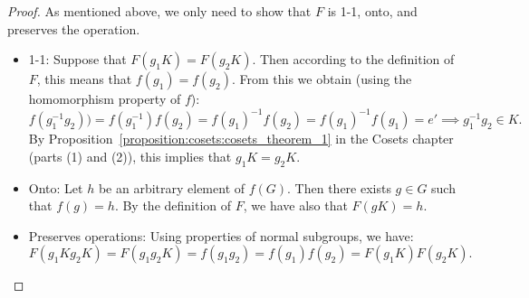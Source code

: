 \begin{proof}
As mentioned above, we only need to show that $F$ is 1-1, onto, and preserves the operation.
\begin{itemize}
\item
1-1: Suppose that $F(g_1K) = F(g_2K)$.  Then according to the definition of $F$, this means that
$f(g_1) = f(g_2)$. From this we obtain (using the homomorphism property of $f$):
\[ f(g_1^{-1}g_2)) = f(g_1^{-1})f(g_2) =  f(g_1)^{-1}f(g_2) = f(g_1)^{-1}f(g_1) = e'  \implies g_1^{-1}g_2 \in K.\]
By Proposition~\ref{proposition:cosets:cosets_theorem_1} in the Cosets chapter (parts (1) and (2)), this implies that $g_1K = g_2K$.
\item
Onto:  Let $h$ be an arbitrary element of $f(G)$. Then there exists $g \in G$ such that $f(g)=h$.  By the definition of $F$, we have
also that $F(gK) = h$.
\item
Preserves operations: Using properties of normal subgroups, we have:
\[F(g_1Kg_2K) = F(g_1g_2K) = f(g_1g_2) = f(g_1)f(g_2) = F(g_1K)F(g_2K).\]
\end{itemize}
\end{proof}

% 
% 
%
%
%
%
%
%
%
%
 
